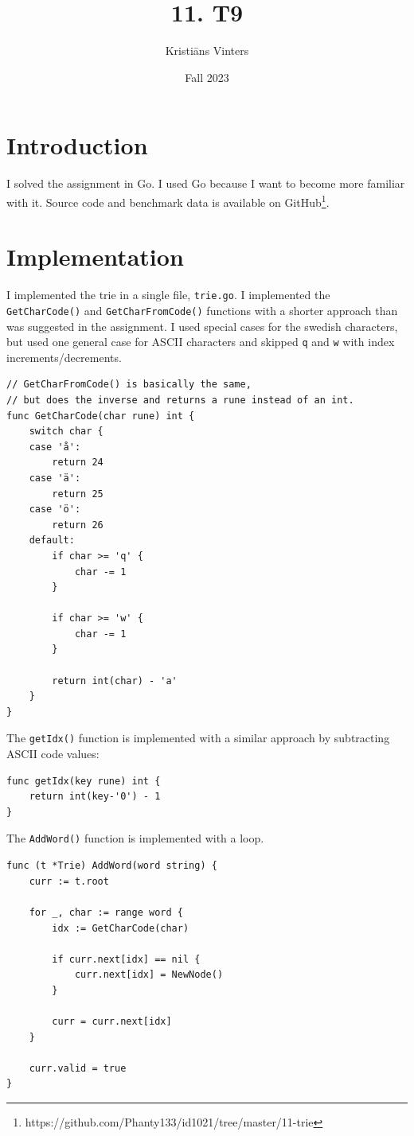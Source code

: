 \documentclass[a4paper,11pt]{article}
\title{\textbf{11. T9}}
\author{Kristiāns Vinters}
\date{Fall 2023}
\begin{document}
    \maketitle
    \section*{Introduction}

    I solved the assignment in Go. I used Go because I want to become more familiar with it. Source code and benchmark data is available on GitHub\footnote{https://github.com/Phanty133/id1021/tree/master/11-trie}.

    \section*{Implementation}

    I implemented the trie in a single file, \texttt{trie.go}. I implemented the \texttt{GetCharCode()} and \texttt{GetCharFromCode()} functions with a shorter approach than was suggested in the assignment. I used special cases for the swedish characters, but used one general case for ASCII characters and skipped \texttt{q} and \texttt{w} with index increments/decrements.

    \begin{verbatim}
// GetCharFromCode() is basically the same,
// but does the inverse and returns a rune instead of an int.
func GetCharCode(char rune) int {
    switch char {
    case 'å':
        return 24
    case 'ä':
        return 25
    case 'ö':
        return 26
    default:
        if char >= 'q' {
            char -= 1
        }

        if char >= 'w' {
            char -= 1
        }

        return int(char) - 'a'
    }
}
    \end{verbatim}

    The \texttt{getIdx()} function is implemented with a similar approach by subtracting ASCII code values:

    \begin{verbatim}
func getIdx(key rune) int {
    return int(key-'0') - 1
}
    \end{verbatim}

    The \texttt{AddWord()} function is implemented with a loop.

    \begin{verbatim}
func (t *Trie) AddWord(word string) {
    curr := t.root

    for _, char := range word {
        idx := GetCharCode(char)

        if curr.next[idx] == nil {
            curr.next[idx] = NewNode()
        }

        curr = curr.next[idx]
    }

    curr.valid = true
}
    \end{verbatim}
\end{document}
